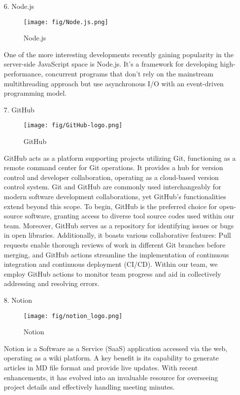 \documentclass[conference]{IEEEtran}
\begin{document}
\begin{enumerate}
    \item[6.]Node.js \cite{tilkov2010node}
    \begin{figure}[h]
    \centering
    \texttt{[image: fig/Node.js.png]}
    \label{fig:Node.js}
    \caption{Node.js} 
    \end{figure}
    \item[]One of the more interesting developments recently gaining popularity in the server-side JavaScript space is Node.js. It's a framework for developing high-performance, concurrent programs that don't rely on the mainstream multithreading approach but use asynchronous I/O with an event-driven programming model.\\
    
    \item[7.]GitHub
    \begin{figure}[h]
    \centering
    \texttt{[image: fig/GitHub-logo.png]}
    \label{fig:GitHub}
    \caption{GitHub} 
    \end{figure}
    \item[]GitHub acts as a platform supporting projects utilizing Git, functioning as a remote command center for Git operations. It provides a hub for version control and developer collaboration, operating as a cloud-based version control system. Git and GitHub are commonly used interchangeably for modern software development collaborations, yet GitHub's functionalities extend beyond this scope. To begin, GitHub is the preferred choice for open-source software, granting access to diverse tool source codes used within our team. Moreover, GitHub serves as a repository for identifying issues or bugs in open libraries. Additionally, it boasts various collaborative features: Pull requests enable thorough reviews of work in different Git branches before merging, and GitHub actions streamline the implementation of continuous integration and continuous deployment (CI/CD). Within our team, we employ GitHub actions to monitor team progress and aid in collectively addressing and resolving errors.\\ 

    \item[8.]Notion 
    \begin{figure}[h]
    \centering
    \texttt{[image: fig/notion\_logo.png]}
    \label{fig:Notion}
    \caption{Notion} 
    \end{figure}
    \item[]Notion is a Software as a Service (SaaS) application accessed via the web, operating as a wiki platform. A key benefit is its capability to generate articles in MD file format and provide live updates. With recent enhancements, it has evolved into an invaluable resource for overseeing project details and effectively handling meeting minutes. \\ \\ \\ \\ \\


\end{enumerate}
\end{document}
